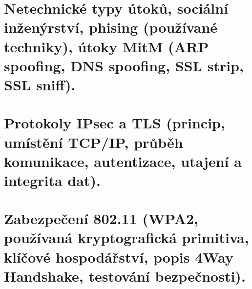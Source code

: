 \newpage
\section{Netechnické typy útoků, sociální inženýrství, phising (používané techniky), útoky MitM (ARP spoofing, DNS spoofing, SSL strip, SSL sniff).}

\newpage
\section{Protokoly IPsec a TLS (princip, umístění TCP/IP, průběh komunikace, autentizace, utajení a integrita dat).}

\newpage
\section{Zabezpečení 802.11 (WPA2, používaná kryptografická primitiva, klíčové hospodářství, popis 4Way Handshake, testování bezpečnosti).}

\newpage